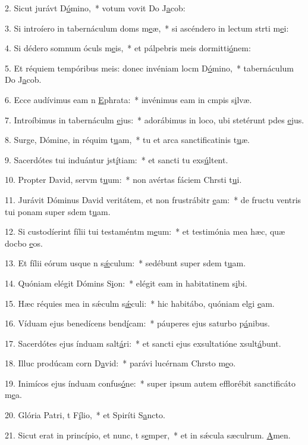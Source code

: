 2. Sicut jurávt D\uline{ó}mino,~* votum vovit Do J\uline{a}cob:\par 
3. Si introíero in tabernáculum doms m\uline{e}æ,~* si ascéndero in lectum strti m\uline{e}i:\par 
4. Si dédero somnum óculs m\uline{e}is,~* et pálpebris meis dormitti\uline{ó}nem:\par 
5. Et réquiem tempóribus meis: donec invéniam locm D\uline{ó}mino,~* tabernáculum Do J\uline{a}cob.\par 
6. Ecce audívimus eam n \uline{E}phrata:~* invénimus eam in cmpis s\uline{i}lvæ.\par 
7. Introíbimus in tabernáculm \uline{e}jus:~* adorábimus in loco, ubi stetérunt pdes \uline{e}jus.\par 
8. Surge, Dómine, in réquim t\uline{u}am,~* tu et arca sanctificatinis t\uline{u}æ.\par 
9. Sacerdótes tui induántur jst\uline{í}tiam:~* et sancti tu exs\uline{ú}ltent.\par 
10. Propter David, servm t\uline{u}um:~* non avértas fáciem Chrsti t\uline{u}i.\par 
11. Jurávit Dóminus David veritátem, et non frustrábitr \uline{e}am:~* de fructu ventris tui ponam super sdem t\uline{u}am.\par 
12. Si custodíerint fílii tui testaméntm m\uline{e}um:~* et testimónia mea hæc, quæ docbo \uline{e}os.\par 
13. Et fílii eórum usque n s\uline{ǽ}culum:~* sedébunt super sdem t\uline{u}am.\par 
14. Quóniam elégit Dómins S\uline{i}on:~* elégit eam in habitatinem s\uline{i}bi.\par 
15. Hæc réquies mea in sǽculm s\uline{ǽ}culi:~* hic habitábo, quóniam elgi \uline{e}am.\par 
16. Víduam ejus benedícens bend\uline{í}cam:~* páuperes ejus saturbo p\uline{á}nibus.\par 
17. Sacerdótes ejus índuam salt\uline{á}ri:~* et sancti ejus exsultatióne xsult\uline{á}bunt.\par 
18. Illuc prodúcam corn D\uline{a}vid:~* parávi lucérnam Chrsto m\uline{e}o.\par 
19. Inimícos ejus índuam confus\uline{ó}ne:~* super ipsum autem efflorébit sanctificáto m\uline{e}a.\par 
20. Glória Patri, t F\uline{í}lio,~* et Spiríti S\uline{a}ncto.\par 
21. Sicut erat in princípio, et nunc, t s\uline{e}mper,~* et in sǽcula sæculrum. \uline{A}men.\par 
